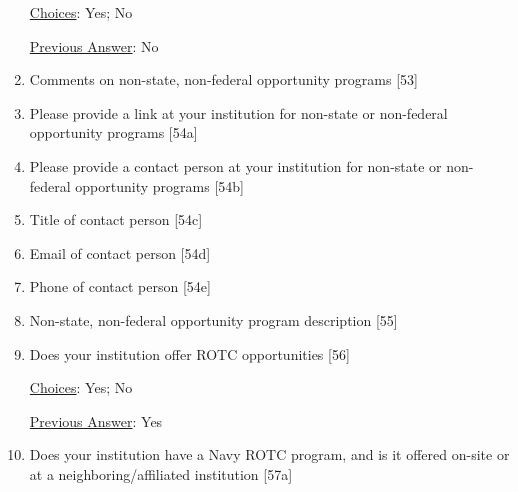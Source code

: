 \documentclass[12 pt, a4paper]{article}
\begin{document}
\begin{Form}
\begin{enumerate}
\underline{Choices}: Yes; No\medskip

\underline{Previous Answer}: No\medskip

\TextField[width = 6 in,multiline, name=90113]{} \medskip

\item Comments on non-state, non-federal opportunity programs [53] \medskip

\TextField[width = 6 in,multiline, name=90114]{} \medskip

\item Please provide a link at your institution for non-state or non-federal opportunity programs [54a] \medskip

\TextField[width = 6 in,multiline, name=90115]{} \medskip

\item Please provide a contact person at your institution for non-state or non-federal opportunity programs [54b] \medskip

\TextField[width = 6 in,multiline, name=90116]{} \medskip

\item Title of contact person [54c] \medskip

\TextField[width = 6 in,multiline, name=90117]{} \medskip

\item Email of contact person [54d] \medskip

\TextField[width = 6 in,multiline, name=90118]{} \medskip

\item Phone of contact person [54e] \medskip

\TextField[width = 6 in,multiline, name=90119]{} \medskip

\item Non-state, non-federal opportunity program description [55] \medskip

\TextField[width = 6 in,multiline, name=90120]{} \medskip

\item Does your institution offer ROTC opportunities [56] \medskip

\underline{Choices}: Yes; No\medskip

\underline{Previous Answer}: Yes\medskip

\TextField[width = 6 in,multiline, name=90121]{} \medskip

\item Does your institution have a Navy ROTC program, and is it offered on-site or at a neighboring/affiliated institution [57a] \medskip


\end{enumerate}
\end{Form}
\end{document}
